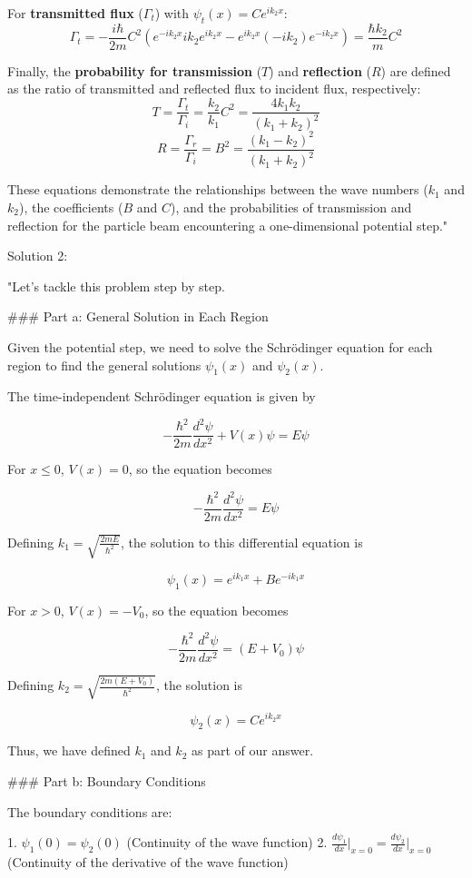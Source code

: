 For \textbf{transmitted flux} (\(\Gamma_t\)) with \(\psi_t(x) = Ce^{ik_2x}\):
\[ \Gamma_t = -\frac{i\hbar}{2m} C^2 \left(e^{-ik_2x}ik_2e^{ik_2x} - e^{ik_2x}(-ik_2)e^{-ik_2x} \right) = \frac{\hbar k_2}{m}C^2 \]

Finally, the \textbf{probability for transmission} (\(T\)) and \textbf{reflection} (\(R\)) are defined as the ratio of transmitted and reflected flux to incident flux, respectively:
\[ T = \frac{\Gamma_t}{\Gamma_i} = \frac{k_2}{k_1}C^2 = \frac{4k_1k_2}{(k_1 + k_2)^2} \]
\[ R = \frac{\Gamma_r}{\Gamma_i} = B^2 = \frac{(k_1 - k_2)^2}{(k_1 + k_2)^2} \]

These equations demonstrate the relationships between the wave numbers (\(k_1\) and \(k_2\)), the coefficients (\(B\) and \(C\)), and the probabilities of transmission and reflection for the particle beam encountering a one-dimensional potential step."

Solution 2:

"Let's tackle this problem step by step.

### Part a: General Solution in Each Region

Given the potential step, we need to solve the Schrödinger equation for each region to find the general solutions \(\psi_1(x)\) and \(\psi_2(x)\).

The time-independent Schrödinger equation is given by

\[
-\frac{\hbar^2}{2m} \frac{d^2\psi}{dx^2} + V(x)\psi = E\psi
\]

For \(x \leq 0\), \(V(x) = 0\), so the equation becomes

\[
-\frac{\hbar^2}{2m} \frac{d^2\psi}{dx^2} = E\psi
\]

Defining \(k_1 = \sqrt{\frac{2mE}{\hbar^2}}\), the solution to this differential equation is

\[
\psi_1(x) = e^{ik_1x} + Be^{-ik_1x}
\]

For \(x > 0\), \(V(x) = -V_0\), so the equation becomes

\[
-\frac{\hbar^2}{2m} \frac{d^2\psi}{dx^2} = (E + V_0)\psi
\]

Defining \(k_2 = \sqrt{\frac{2m(E+V_0)}{\hbar^2}}\), the solution is

\[
\psi_2(x) = Ce^{ik_2x}
\]

Thus, we have defined \(k_1\) and \(k_2\) as part of our answer.

### Part b: Boundary Conditions

The boundary conditions are:

1. \(\psi_1(0) = \psi_2(0)\) (Continuity of the wave function)
2. \(\frac{d\psi_1}{dx}\bigg|_{x=0} = \frac{d\psi_2}{dx}\bigg|_{x=0}\) (Continuity of the derivative of the wave function)

